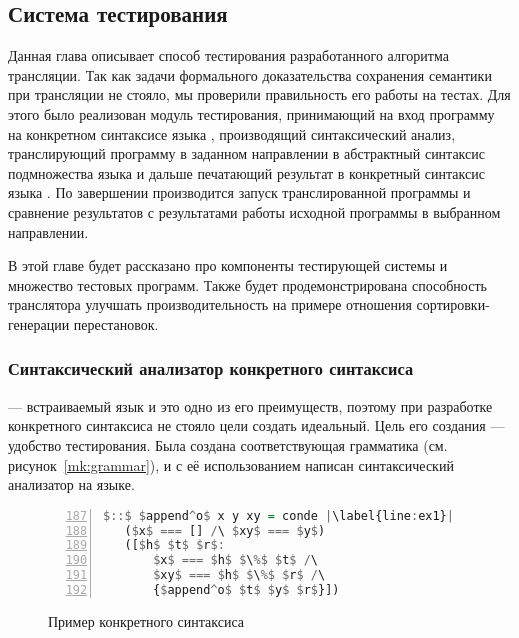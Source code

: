 \subsection{Система тестирования}

Данная глава описывает способ тестирования разработанного алгоритма трансляции.
Так как задачи формального доказательства сохранения семантики при трансляции не стояло, мы проверили правильность его работы на тестах.
Для этого было реализован модуль тестирования, принимающий на вход программу на конкретном синтаксисе языка \miniKanren{}, производящий синтаксический анализ, транслирующий программу в заданном направлении в абстрактный синтаксис подмножества языка \haskell{} и дальше печатающий результат в конкретный синтаксис языка \haskell{}.
По завершении производится запуск транслированной программы и сравнение результатов с результатами работы исходной программы \miniKanren{} в выбранном направлении.

В этой главе будет рассказано про компоненты тестирующей системы и множество тестовых программ.
Также будет продемонстрирована способность транслятора улучшать производительность на примере отношения сортировки-генерации перестановок.


\subsubsection{Синтаксический анализатор конкретного синтаксиса \miniKanren{}}

\miniKanren{} --- встраиваемый язык и это одно из его преимуществ, поэтому при разработке конкретного синтаксиса не стояло цели создать идеальный.
Цель его создания --- удобство тестирования.
Была создана соответствующая грамматика (см. рисунок~\ref{mk:grammar}), и с её использованием написан синтаксический анализатор на языке.

\begin{figure}[h!]
  \begin{center}
  \begin{minipage}{0.5\textwidth}
  \begin{lstlisting}[language=Haskell, frame=single, numbers=left,numberstyle=\small, firstnumber=187, escapechar=|]
 $::$ $append^o$ x y xy = conde |\label{line:ex1}|
   ($x$ === [] /\ $xy$ === $y$)
   ([$h$ $t$ $r$:
       $x$ === $h$ $\%$ $t$ /\
       $xy$ === $h$ $\%$ $r$ /\
       {$append^o$ $t$ $y$ $r$}])
  \end{lstlisting}
  \end{minipage}
  \end{center}
  \caption{Пример конкретного синтаксиса \miniKanren{}}
  \label{lst:ex}
\end{figure}

